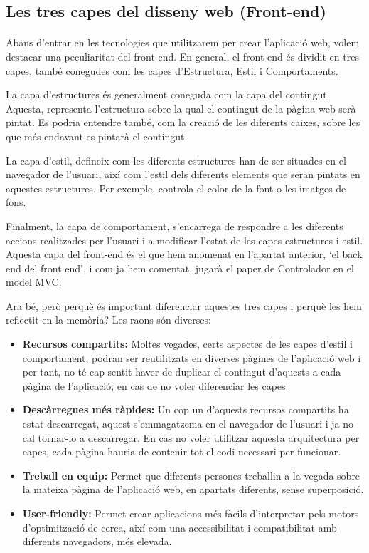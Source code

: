 \subsection{Les tres capes del disseny web (Front-end)}

    \paragraph{}
    Abans d'entrar en les tecnologies que utilitzarem per crear l’aplicació web, volem destacar una peculiaritat del front-end. En general, el front-end és dividit en tres capes, també conegudes com les capes d’Estructura, Estil i Comportaments.

    La capa d'estructures és generalment coneguda com la capa del contingut. Aquesta, representa l'estructura sobre la qual el contingut de la pàgina web serà pintat. Es podria entendre també, com la creació de les diferents caixes, sobre les que més endavant es pintarà el contingut.

    La capa d'estil, defineix com les diferents estructures han de ser situades en el navegador de l’usuari, així com l'estil dels diferents elements que seran pintats en aquestes estructures. Per exemple, controla el color de la font o les imatges de fons.

    Finalment, la capa de comportament, s'encarrega de respondre a les diferents accions realitzades per l'usuari i a modificar l’estat de les capes estructures i estil. Aquesta capa del front-end és el que hem anomenat en l'apartat anterior, `el back end del front end’, i com ja hem comentat, jugarà el paper de Controlador en el model MVC.

    Ara bé, però perquè és important diferenciar aquestes tres capes i perquè les hem reflectit en la memòria? Les raons són diverses:

    \begin{itemize}
        \item \textbf{Recursos compartits:} Moltes vegades, certs aspectes de les capes d'estil i comportament, podran ser reutilitzats en diverses pàgines de l’aplicació web i per tant, no té cap sentit haver de duplicar el contingut d’aquests a cada pàgina de l’aplicació, en cas de no voler diferenciar les capes.
        \item \textbf{Descàrregues més ràpides:} Un cop un d'aquests recursos compartits ha estat descarregat, aquest s’emmagatzema en el navegador de l’usuari i ja no cal tornar-lo a descarregar. En cas no voler utilitzar aquesta arquitectura per capes, cada pàgina hauria de contenir tot el codi necessari per funcionar.
        \item \textbf{Treball en equip:} Permet que diferents persones treballin a la vegada sobre la mateixa pàgina de l’aplicació web, en apartats diferents, sense superposició.
        \item \textbf{User-friendly:} Permet crear aplicacions més fàcils d’interpretar pels motors d’optimització de cerca, així com una accessibilitat i compatibilitat amb diferents navegadors, més elevada.
    \end{itemize}
